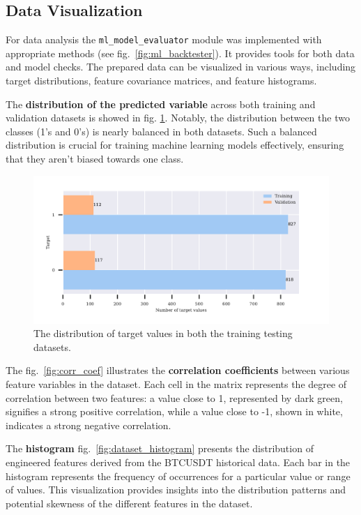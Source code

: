 \newpage

\subsection{Data Visualization}
For data analysis the \texttt{ml\_model\_evaluator} module was implemented with appropriate methods (see fig.~\ref{fig:ml_backtester}).
It provides tools for both data and model checks.
The prepared data can be visualized in various ways, including target distributions, feature covariance matrices, and feature histograms.

The \textbf{distribution of the predicted variable} across both training and validation datasets is showed in fig. \ref{fig:signal_distribution}.
Notably, the distribution between the two classes (1's and 0's) is nearly balanced in both datasets.
Such a balanced distribution is crucial for training machine learning models effectively, ensuring that they aren't biased towards one class.

\begin{figure}[h]
\centering
\begin{adjustbox}{max width=1\textwidth,center}
    \includegraphics[scale=1]{./pdf/report/sig_distr.pdf}
\end{adjustbox}
    \caption{The distribution of target values in both the training testing datasets.}
\label{fig:signal_distribution}
\end{figure}


The fig.~\ref{fig:corr_coef} illustrates the \textbf{correlation coefficients} between various feature variables in the dataset.
Each cell in the matrix represents the degree of correlation between two features: a value close to 1, represented by dark green, signifies a strong positive correlation, while a value close to -1, shown in white, indicates a strong negative correlation.

The \textbf{histogram} fig.~\ref{fig:dataset_histogram} presents the distribution of engineered features derived from the BTCUSDT historical data.
Each bar in the histogram represents the frequency of occurrences for a particular value or range of values.
This visualization provides insights into the distribution patterns and potential skewness of the different features in the dataset.

